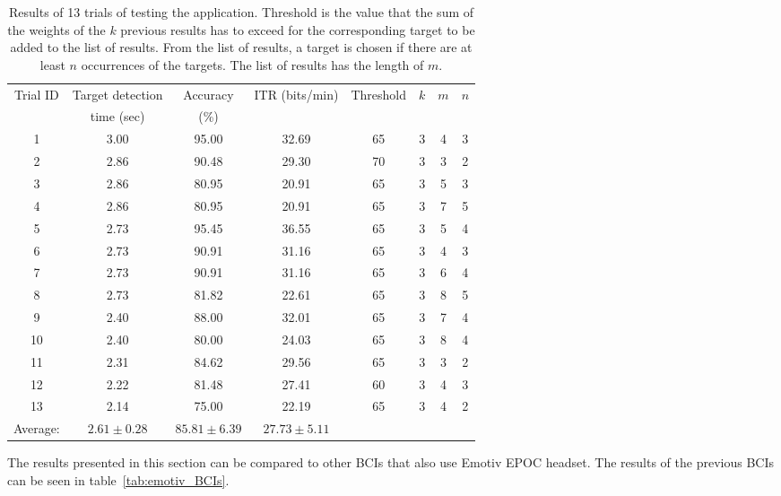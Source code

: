 \begin{table}[h]
	\centering
	\begin{tabular}{|c|c|c|c|c|c|c|c|}\hline
Trial ID	& Target detection 	& Accuracy	& ITR (bits/min)	& Threshold&$k$ & $m$& $n$\\
			& time (sec)		& (\%)		&					&   &  &  & \\\hline
1			& 3.00				& 95.00		& 32.69				& 65& 3& 4& 3\\\hline
2			& 2.86				& 90.48		& 29.30				& 70& 3& 3& 2\\\hline
3			& 2.86				& 80.95		& 20.91				& 65& 3& 5& 3\\\hline
4			& 2.86				& 80.95		& 20.91				& 65& 3& 7& 5\\\hline
5			& 2.73				& 95.45 	& 36.55				& 65& 3& 5& 4\\\hline
6			& 2.73				& 90.91		& 31.16				& 65& 3& 4& 3\\\hline
7			& 2.73				& 90.91		& 31.16				& 65& 3& 6& 4\\\hline
8 			& 2.73	 			& 81.82 	& 22.61 			& 65& 3& 8& 5\\\hline
9 			& 2.40 				& 88.00 	& 32.01 			& 65& 3& 7& 4\\\hline
10 			& 2.40 				& 80.00 	& 24.03 			& 65& 3& 8& 4\\\hline
11 			& 2.31				& 84.62 	& 29.56 			& 65& 3& 3& 2\\\hline
12 			& 2.22 				& 81.48 	& 27.41 			& 60& 3& 4& 3\\\hline
13 			& 2.14 				& 75.00		& 22.19 			& 65& 3& 4& 2\\\hline
Average:	& $2.61\pm 0.28$ 	& $85.81\pm 6.39$	& $27.73\pm 5.11$\\\cline{1-4}
	\end{tabular}
	\caption{Results of 13 trials of testing the application. Threshold is the value that the sum of the weights of the $k$ previous results has to exceed for the corresponding target to be added to the list of results. From the list of results, a target is chosen if there are at least $n$ occurrences of the targets. The list of results has the length of $m$.}
	\label{tab:results}
\end{table}

The results presented in this section can be compared to other \glspl{BCI} that also use Emotiv EPOC headset. The results of the previous \glspl{BCI} can be seen in table~\ref{tab:emotiv_BCIs}.
